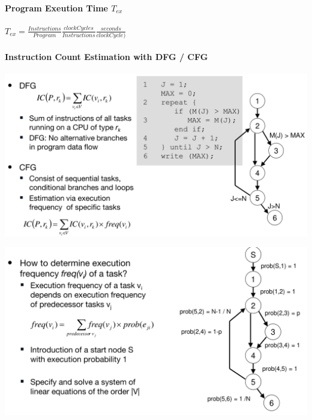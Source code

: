 \documentclass[english]{latex4ei/latex4ei_sheet}
\begin{document}
\paragraph{Program Exeution Time $T_{ex}$}
$T_{ex} = \frac{Instructions}{Program} \frac{clockCycles}{Instructions} \frac{seconds}{clockCycle)}$

\paragraph{Instruction Count Estimation with DFG / CFG}

\begin{center}
  \includegraphics[width=\linewidth]{assets/InstructionCountEstDFG.png}
  \label{fig:instructioncountestdfg}
\end{center}


\begin{center}
  \includegraphics[width=\linewidth]{assets/ICECFG.png}
  \label{fig:icecfg}
\end{center}

\end{document}
